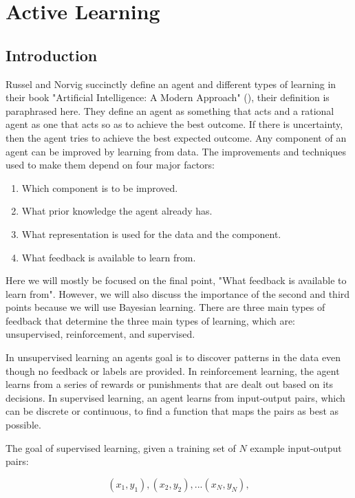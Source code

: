 \chapter{Active Learning}



\section{Introduction}
Russel and Norvig succinctly define an agent and different types of learning in their book "Artificial Intelligence: A Modern Approach" (\cite{russell2009artificial}), their definition is paraphrased here. They define an agent as something that acts and a rational agent as one that acts so as to achieve the best outcome. If there is uncertainty, then the agent tries to achieve the best expected outcome. Any component of an agent can be improved by learning from data. The improvements and techniques used to make them depend on four major factors:

\begin{enumerate}
  \item Which component is to be improved.
  \item What prior knowledge the agent already has.
  \item What representation is used for the data and the component.
  \item What feedback is available to learn from.  
\end{enumerate}

Here we will mostly be focused on the final point, "What feedback is available to learn from". However, we will also discuss the importance of the second and third points because we will use Bayesian learning. There are three main types of feedback that determine the three main types of learning, which are: unsupervised, reinforcement, and supervised. 

In unsupervised learning an agents goal is to discover patterns in the data even though no feedback or labels are provided. In reinforcement learning, the agent learns from a series of rewards or punishments that are dealt out based on its decisions. In supervised learning, an agent learns from input-output pairs, which can be discrete or continuous, to find a function that maps the pairs as best as possible. 

The goal of supervised learning, given a training set of $N$ example input-output pairs:

\[(x_1, y_1), (x_2,y_2),... (x_N,y_N),\]

